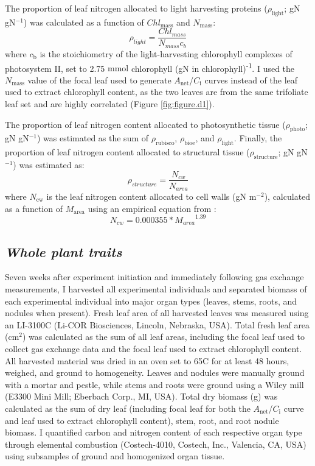 The proportion of leaf nitrogen allocated to light harvesting proteins ($\rho_\mathrm{light}$; gN gN$^{-1}$) was calculated as a function of $Chl_\mathrm{mass}$ and $N_\mathrm{mass}$:
\begin{equation} \label{eqn_5.8}
    \rho_{light}=\frac{Chl_{mass}}{N_{mass}c_{b}}
\end{equation}
\noindent where $c_\mathrm{b}$ is the stoichiometry of the light-harvesting chlorophyll complexes of photosystem II, set to 2.75 $\mathrm{mmol}$ chlorophyll (gN in chlorophyll)\textsuperscript{-1}. I used the $N_\mathrm{mass}$ value of the focal leaf used to generate $A_\mathrm{net}$/$C_\mathrm{i}$ curves instead of the leaf used to extract chlorophyll content, as the two leaves are from the same trifoliate leaf set and are highly correlated (Figure \ref{fig:figure.d1}).

The proportion of leaf nitrogen content allocated to photosynthetic tissue ($\rho_\mathrm{photo}$; gN gN$^{-1}$) was estimated as the sum of $\rho_\mathrm{rubisco}$, $\rho_\mathrm{bioe}$, and $\rho_\mathrm{light}$. Finally, the proportion of leaf nitrogen content allocated to structural tissue ($\rho_\mathrm{structure}$; gN gN$^{-1}$) was estimated as:
\begin{equation} \label{eqn_5.9}
    \rho_{structure}=\frac{N_{cw}}{N_{area}}
\end{equation}
\noindent where $N_\mathrm{cw}$ is the leaf nitrogen content allocated to cell walls (gN m$^{-2}$), calculated as a function of $M_\mathrm{area}$ using an empirical equation from :
\begin{equation} \label{eqn_5.10}
    N_{cw}=0.000355*{M_{area}}^{1.39}
\end{equation}

\subsection{\textit{Whole plant traits}}
\noindent Seven weeks after experiment initiation and immediately following gas exchange measurements, I harvested all experimental individuals and separated biomass of each experimental individual into major organ types (leaves, stems, roots, and nodules when present). Fresh leaf area of all harvested leaves was measured using an LI-3100C (Li-COR Biosciences, Lincoln, Nebraska, USA). Total fresh leaf area (cm$^2$) was calculated as the sum of all leaf areas, including the focal leaf used to collect gas exchange data and the focal leaf used to extract chlorophyll content. All harvested material was dried in an oven set to 65\textdegree{}C for at least 48 hours, weighed, and ground to homogeneity. Leaves and nodules were manually ground with a mortar and pestle, while stems and roots were ground using a Wiley mill (E3300 Mini Mill; Eberbach Corp., MI, USA). Total dry biomass (g) was calculated as the sum of dry leaf (including focal leaf for both the $A_\mathrm{net}$/$C_\mathrm{i}$ curve and leaf used to extract chlorophyll content), stem, root, and root nodule biomass. I quantified carbon and nitrogen content of each respective organ type through elemental combustion (Costech-4010, Costech, Inc., Valencia, CA, USA) using subsamples of ground and homogenized organ tissue. 

